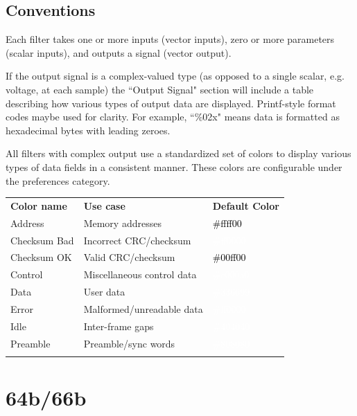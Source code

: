 \subsection{Conventions}

Each filter takes one or more inputs (vector inputs), zero or more parameters (scalar inputs), and outputs a
signal (vector output).

If the output signal is a complex-valued type (as opposed to a single scalar, e.g. voltage, at each sample) the
``Output Signal" section will include a table describing how various types of output data are displayed. Printf-style
format codes maybe used for clarity. For example, ``\%02x" means data is formatted as hexadecimal bytes with leading
zeroes.

All filters with complex output use a standardized set of colors to display various types of data fields in a
consistent manner. These colors are configurable under the  preferences category.

\begin{tabularx}{16cm}{llX}
\thickhline
\textbf{Color name} & \textbf{Use case} & \textbf{Default Color} \\
\thickhline
Address & Memory addresses & \cellcolor{address}\textcolor{black}{\#ffff00} \\
\thickhline
Checksum Bad & Incorrect CRC/checksum & \cellcolor{checksumbad}\textcolor{white}{\#ff0000} \\
\thickhline
Checksum OK & Valid CRC/checksum & \cellcolor{checksumok}\textcolor{black}{\#00ff00} \\
\thickhline
Control & Miscellaneous control data & \cellcolor{control}\textcolor{white}{\#c000a0} \\
\thickhline
Data & User data & \cellcolor{data}\textcolor{white}{\#336699} \\
\thickhline
Error & Malformed/unreadable data & \cellcolor{error}\textcolor{white}{\#ff0000} \\
\thickhline
Idle & Inter-frame gaps & \cellcolor{idle}\textcolor{white}{\#404040} \\
\thickhline
Preamble & Preamble/sync words & \cellcolor{preamble}\textcolor{white}{\#808080} \\
\thickhline
\end{tabularx}

\pagebreak
\section{64b/66b}
\label{filter:64b66b}

